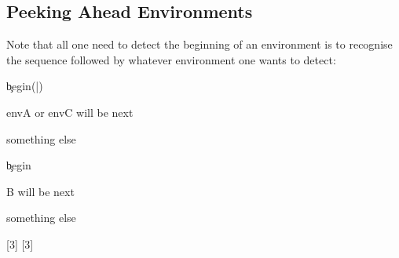 \documentclass[10pt]{article}
\begin{document}
\begin{codestore}[demoA]

  
  
\end{codestore}


\subsection{Peeking Ahead Environments}

Note that all one need to detect the beginning of an environment is to recognise the sequence  followed by whatever environment one wants to detect:

\begin{codestore}[cmd-defs]
\xpeekSetCmd{\detectEnvAC}
  {\c{begin}(|)}
  {\hspace{5mm} envA or envC will be next\par}
  {\hspace{5mm} something else\par}

\xpeekSetCmd{\detectEnvB}
  {\c{begin}}
  {\hspace{5mm} B will be next\par}
  {\hspace{5mm} something else\par}
\end{codestore}
[3]
[3]
\end{document}
